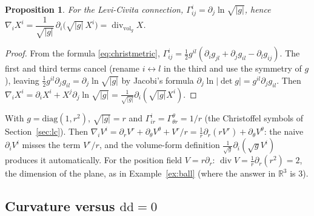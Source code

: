 \documentclass[11pt,a4paper]{article}
\newcounter{thm}[section]
\numberwithin{equation}{section}
\theoremstyle{definition}
\theoremstyle{plain}
\newtheorem{proposition}[thm]{Proposition}
\newcommand{\R}{\mathbb{R}}
\newcommand{\dd}{\mathrm{d}}
\newcommand{\vol}{\mathrm{vol}}
\begin{document}
\begin{proposition}\label{prop:divagree}
For the Levi-Civita connection, $\Gamma^i_{ij}=\partial_j\ln\sqrt{|g|}$, hence $\nabla_iX^i=\dfrac1{\sqrt{|g|}}\,\partial_i\bigl(\sqrt{|g|}\,X^i\bigr)=\operatorname{div}_{\vol_g}X$.
\end{proposition}
\begin{proof}
From the formula \eqref{eq:christmetric}, $\Gamma^i_{ij}=\frac12g^{il}(\partial_ig_{jl}+\partial_jg_{il}-\partial_lg_{ij})$. The first and third terms cancel (rename $i\leftrightarrow l$ in the third and use the symmetry of $g$), leaving $\frac12g^{il}\partial_jg_{il}=\partial_j\ln\sqrt{|g|}$ by Jacobi's formula $\partial_j\ln|\det g|=g^{il}\partial_jg_{il}$. Then $\nabla_iX^i=\partial_iX^i+X^j\partial_j\ln\sqrt{|g|}=\frac1{\sqrt{|g|}}\partial_i(\sqrt{|g|}X^i)$.
\end{proof}

\begin{example}\label{ex:polardiv}
With $g=\mathrm{diag}(1,r^2)$, $\sqrt{|g|}=r$ and $\Gamma^i_{ir}=\Gamma^\theta_{\theta r}=1/r$ (the Christoffel symbols of Section~\ref{sec:lc}). Then $\nabla_iV^i=\partial_rV^r+\partial_\theta V^\theta+V^r/r=\frac1r\partial_r(rV^r)+\partial_\theta V^\theta$: the naive $\partial_iV^i$ misses the term $V^r/r$, and the volume-form definition $\frac1{\sqrt g}\partial_i(\sqrt gV^i)$ produces it automatically. For the position field $V=r\partial_r$: $\operatorname{div}V=\frac1r\partial_r(r^2)=2$, the dimension of the plane, as in Example~\ref{ex:ball} (where the answer in $\R^3$ is $3$).
\end{example}

\subsection{Curvature versus $\dd\dd=0$}\label{sec:curvdd}
\end{document}
